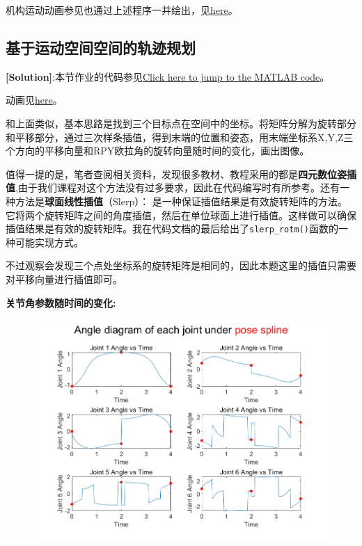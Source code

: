 \documentclass{ctexart}
\begin{document}
机构运动动画参见也通过上述程序一并绘出，见\href{src/robot_animation.avi}{here}。

\subsection{基于运动空间空间的轨迹规划}
\textbf{[Solution]}:本节作业的代码参见\href{src/Rhw_5_2_2_main.m}{Click here to jump to the MATLAB code}。

动画见\href{src/robot_animation_bypose.avi}{here}。

和上面类似，基本思路是找到三个目标点在空间中的坐标。将矩阵分解为旋转部分和平移部分，通过三次样条插值，得到末端的位置和姿态，用末端坐标系X,Y,Z三个方向的平移向量和RPY欧拉角的旋转向量随时间的变化，画出图像。

值得一提的是，笔者查阅相关资料，发现很多教材、教程采用的都是\textbf{四元数位姿插值},由于我们课程对这个方法没有过多要求，因此在代码编写时有所参考。还有一种方法是\textbf{球面线性插值}（Slerp）： 是一种保证插值结果是有效旋转矩阵的方法。它将两个旋转矩阵之间的角度插值，然后在单位球面上进行插值。这样做可以确保插值结果是有效的旋转矩阵。我在代码文档的最后给出了\verb|slerp_rotm()|函数的一种可能实现方式。

不过观察会发现三个点处坐标系的旋转矩阵是\textcolor{cherry}{相同}的，因此本题这里的插值只需要对平移向量进行插值即可。

\textbf{\textcolor{cherry}{关节角参数随时间的变化:}}
\begin{figure}[h]
	\centering
	\includegraphics[width=\textwidth]{Image/angle_spline_diagram_pose.png}
\end{figure}
\newpage
\end{document}
